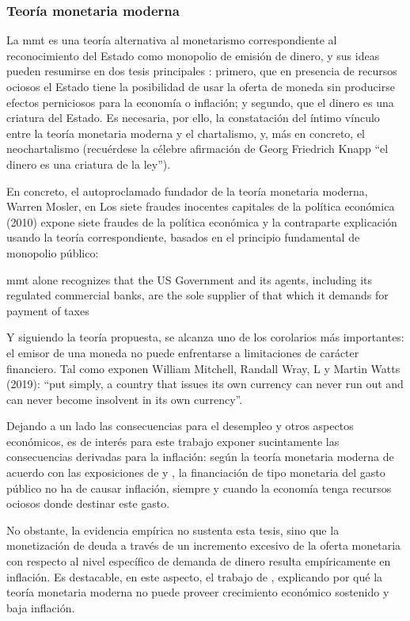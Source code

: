 \documentclass[titlepage, 12pt]{article}
\begin{document}
\subsubsection{Teoría monetaria moderna}
La \acrfull{mmt} es una teoría alternativa al monetarismo correspondiente al reconocimiento del Estado como monopolio de emisión de dinero, y sus ideas pueden resumirse en dos tesis principales \autocite{rallo2015}: primero, que en presencia de recursos ociosos el Estado tiene la posibilidad de usar la oferta de moneda sin producirse efectos perniciosos para la economía o inflación; y segundo, que el dinero es una criatura del Estado. Es necesaria, por ello, la constatación del íntimo vínculo entre la teoría monetaria moderna y el chartalismo, y, más en concreto, el neochartalismo (recuérdese la célebre afirmación de Georg Friedrich Knapp \enquote{el dinero es una criatura de la ley}).

En concreto, el autoproclamado fundador de la teoría monetaria moderna, Warren Mosler, en Los siete fraudes inocentes capitales de la política económica (2010) expone siete fraudes de la política económica y la contraparte explicación usando la teoría correspondiente, basados en el principio fundamental de monopolio público:

\begin{displayquote}
    \acrshort{mmt} alone recognizes that the US Government and its agents, including its regulated commercial banks, are the sole supplier of that which it demands for payment of taxes \autocite{mosler2020}
\end{displayquote}

Y siguiendo la teoría propuesta, se alcanza uno de los corolarios más importantes: el emisor de una moneda no puede enfrentarse a limitaciones de carácter financiero. Tal como exponen William Mitchell, Randall Wray, L y Martin Watts (2019): \enquote{put simply, a country that issues its own currency can never run out and can never become insolvent in its own currency}.

Dejando a un lado las consecuencias para el desempleo y otros aspectos económicos, es de interés para este trabajo exponer sucintamente las consecuencias derivadas para la inflación: según la teoría monetaria moderna de acuerdo con las exposiciones de \cite{mitchell2019} y \cite{kelton2020}, la financiación de tipo monetaria del gasto público no ha de causar inflación, siempre y cuando la economía tenga recursos ociosos donde destinar este gasto.

No obstante, la evidencia empírica no sustenta esta tesis, sino que la monetización de deuda a través de un incremento excesivo de la oferta monetaria con respecto al nivel específico de demanda de dinero resulta empíricamente en inflación. Es destacable, en este aspecto, el trabajo de \cite{castaneda2021}, explicando por qué la teoría monetaria moderna no puede proveer crecimiento económico sostenido y baja inflación.
\end{document}
